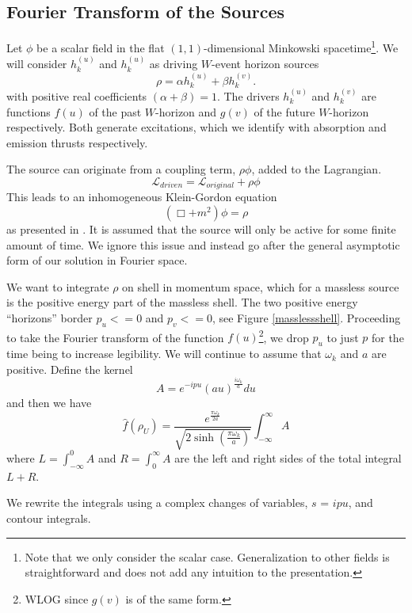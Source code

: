 \documentclass[12pt,a4paper]{article}
\begin{document}
\subsection{Fourier Transform of the Sources}

Let $\phi$ be a scalar field in the flat $(1,1)$-dimensional Minkowski spacetime\footnote{Note that we only consider the scalar case.  Generalization to other fields is straightforward and does not add any intuition to the presentation.}.  We will consider $h^{(u)}_k$ and $h^{(u)}_k$ as driving $W$-event horizon sources
\begin{equation}
\label{ab}
\rho = \alpha h^{(u)}_k + \beta h^{(v)}_k.
\end{equation}
with positive real coefficients $(\alpha + \beta) = 1$.
The drivers $h^{(u)}_k$ and $h^{(v)}_k$ are functions $f(u)$ of the past $W$-horizon and $g(v)$ of the future $W$-horizon respectively.  Both generate excitations, which we identify with absorption and emission thrusts respectively.


The source can originate from a coupling term, $\rho \phi$, added to the Lagrangian.
\[
\mathcal{L}_{driven} = \mathcal{L}_{original} + \rho\phi 
\]
This leads to an inhomogeneous Klein-Gordon equation
\[
(\Box + m^2) \phi = \rho
\]
as presented in \cite{beisert}. It is assumed that the source will only be active for some finite amount of time.  We ignore this issue and instead go after the general asymptotic form of our solution in Fourier space.

We want to integrate $\rho$ on shell in momentum space, which for a massless source is the positive energy part of the massless shell.  The two positive energy ``horizons'' border $p_u <= 0$ and $p_v <= 0$, see Figure \ref{masslessshell}.  Proceeding to take the Fourier transform of the function $f(u)$\footnote{WLOG since $g(v)$ is of the same form.}, we drop $p_u$ to just $p$ for the time being to increase legibility.  We will continue to assume that $\omega_k$ and $a$ are positive. Define the kernel
\[
  A = e^{-i p u} (au)^\frac{i\omega_k}{a} du
\]
and then we have
\begin{equation}
\label{finalnorm}
  \hat{f}(\rho_U) =  \frac{e^{\frac{\pi \omega_k}{2a}}}{\sqrt{2 \sinh \left({\frac{\pi\omega_k}{a}}\right)}}  \int_{-\infty}^\infty A
\end{equation}
where $L=\int_{-\infty}^0 A$ and $R=\int_0^\infty A$ are the left and right sides of the total integral $L + R$.

We rewrite the integrals using a complex changes of variables, $s$ = $ipu$, and contour integrals.
\end{document}
